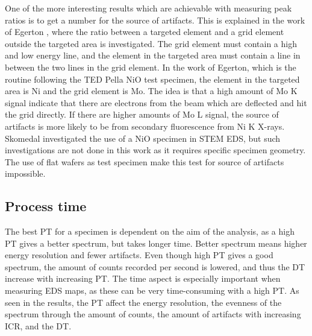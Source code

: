One of the more interesting results which are achievable with measuring peak ratios is to get a number for the source of artifacts.
This is explained in the work of Egerton \cite{egerton_nio_characterization_1994}, where the ratio between a targeted element and a grid element outside the targeted area is investigated.
The grid element must contain a high and low energy line, and the element in the targeted area must contain a line in between the two lines in the grid element.
In the work of Egerton, which is the routine following the TED Pella NiO test specimen, the element in the targeted area is Ni and the grid element is Mo.
The idea is that a high amount of Mo K signal indicate that there are electrons from the beam which are deflected and hit the grid directly.
If there are higher amounts of Mo L signal, the source of artifacts is more likely to be from secondary fluorescence from Ni K X-rays.
Skomedal \cite{skomedal_improving_2022} investigated the use of a NiO specimen in STEM EDS, but such investigations are not done in this work as it requires specific specimen geometry.
The use of flat wafers as test specimen make this test for source of artifacts impossible.









\subsection{Process time}
\label{discussion:process_time}

The best PT for a specimen is dependent on the aim of the analysis, as a high PT gives a better spectrum, but takes longer time.
Better spectrum means higher energy resolution and fewer artifacts.
Even though high PT gives a good spectrum, the amount of counts recorded per second is lowered, and thus the DT increase with increasing PT.
The time aspect is especially important when measuring EDS maps, as these can be very time-consuming with a high PT.
As seen in the results, the PT affect the energy resolution, the evenness of the spectrum through the amount of counts, the amount of artifacts with increasing ICR, and the DT.


